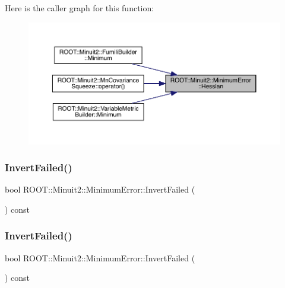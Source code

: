 Here is the caller graph for this function\+:\nopagebreak
\begin{figure}[H]
\begin{center}
\leavevmode
\includegraphics[width=350pt]{d5/d32/classROOT_1_1Minuit2_1_1MinimumError_a7f591009a8e0d017a77da5efa5f6a7e0_icgraph}
\end{center}
\end{figure}
\mbox{\label{classROOT_1_1Minuit2_1_1MinimumError_ae9f212180703d5504c281f90efee263a}} 
\subsubsection{\texorpdfstring{InvertFailed()}{InvertFailed()}\hspace{0.1cm}{\footnotesize\ttfamily [1/2]}}
{\footnotesize\ttfamily bool R\+O\+O\+T\+::\+Minuit2\+::\+Minimum\+Error\+::\+Invert\+Failed (\begin{DoxyParamCaption}{ }\end{DoxyParamCaption}) const\hspace{0.3cm}{\ttfamily [inline]}}

\mbox{\label{classROOT_1_1Minuit2_1_1MinimumError_ae9f212180703d5504c281f90efee263a}} 
\subsubsection{\texorpdfstring{InvertFailed()}{InvertFailed()}\hspace{0.1cm}{\footnotesize\ttfamily [2/2]}}
{\footnotesize\ttfamily bool R\+O\+O\+T\+::\+Minuit2\+::\+Minimum\+Error\+::\+Invert\+Failed (\begin{DoxyParamCaption}{ }\end{DoxyParamCaption}) const\hspace{0.3cm}{\ttfamily [inline]}}

